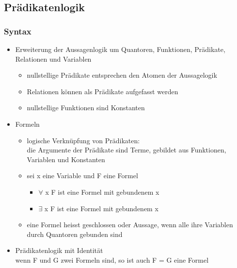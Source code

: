 \documentclass[a4paper,10pt]{article}
\begin{document}
\subsection{Pr\"adikatenlogik}
\subsubsection{Syntax}
\begin{itemize}
	\item Erweiterung der Aussagenlogik um Quantoren, Funktionen, Pr\"adikate, Relationen und Variablen
		\begin{itemize} 
			\item nullstellige Pr\"adikate entsprechen den Atomen der Aussagelogik
			\item Relationen k\"onnen als Pr\"adikate aufgefasst werden
			\item nullstellige Funktionen sind Konstanten
		\end{itemize}
	\item Formeln
		\begin{itemize}
			\item logische Verkn\"upfung von Pr\"adikaten: \\
				die Argumente der Pr\"adikate sind Terme, gebildet aus Funktionen, Variablen und Konstanten
			\item sei x eine Variable und F eine Formel
				\begin{itemize}
					\item $\forall$ x F ist eine Formel mit gebundenem x
					\item $\exists$ x F ist eine Formel mit gebundenem x
				\end{itemize}
			\item eine Formel heisst geschlossen oder Aussage, wenn alle ihre Variablen durch Quantoren gebunden sind
		\end{itemize}
	\item Pr\"adikatenlogik mit Identit\"at \\
		wenn F und G zwei Formeln sind, so ist auch F = G eine Formel
\end{itemize}
\end{document}
